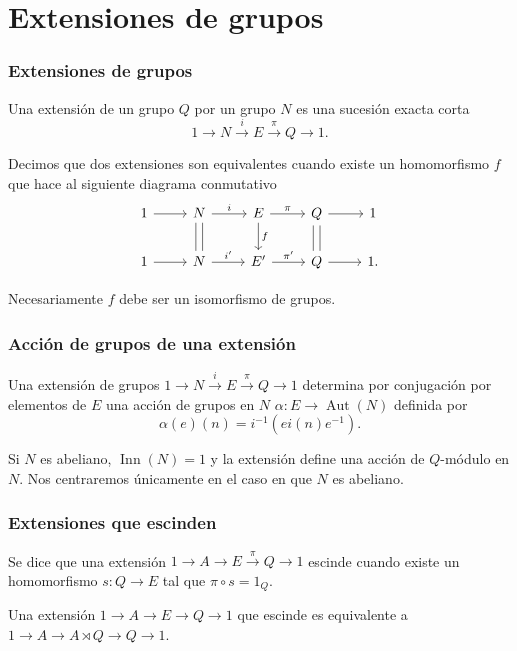 \documentclass[
	11pt, %
]{beamer}
\DeclareMathOperator{\Aut}{Aut}
\DeclareMathOperator{\Inn}{Inn}
\newcommand{\homo}[3]{#1\colon #2\to #3}
\newcommand{\extension}[5]{1\xrightarrow{} #3 \xrightarrow{#1} #4\xrightarrow{#2} #5 \xrightarrow{} 1}
\begin{document}
\section{Extensiones de grupos}

\begin{frame}[fragile]
	\frametitle{Extensiones de grupos}
	
	Una extensión de un grupo $Q$ por un grupo $N$ es una sucesión exacta corta $$\extension i \pi N E Q.$$
	
	\pause
	Decimos que dos extensiones son equivalentes cuando existe un homomorfismo $f$ que hace al siguiente diagrama conmutativo
	\[\begin{tikzcd}
		1 & N & E & Q & 1 \\
		1 & N & {E'} & Q & 1.
		\arrow[from=1-1, to=1-2]
		\arrow["i", from=1-2, to=1-3]
		\arrow["\pi", from=1-3, to=1-4]
		\arrow[from=1-4, to=1-5]
		\arrow[from=2-1, to=2-2]
		\arrow["{i'}", from=2-2, to=2-3]
		\arrow["{\pi'}", from=2-3, to=2-4]
		\arrow[from=2-4, to=2-5]
		\arrow[shift left=1, no head, from=1-4, to=2-4]
		\arrow[shift left=1, no head, from=2-4, to=1-4]
		\arrow["f", from=1-3, to=2-3]
		\arrow[shift left=1, no head, from=1-2, to=2-2]
		\arrow[shift left=1, no head, from=2-2, to=1-2]
	\end{tikzcd}\]
	
	Necesariamente $f$ debe ser un isomorfismo de grupos.
	
\end{frame}


\begin{frame}
	\frametitle{Acción de grupos de una extensión}
	Una extensión de grupos $\extension {i}{\pi} N E Q$ determina por conjugación por elementos de $E$ una acción de grupos en $N$ $\homo \alpha E {\Aut(N)}$ definida por
	$$
		\alpha(e)(n) = i^{-1}(ei(n)e^{-1}).
	$$
	
	\pause
	
	Si $N$ es abeliano, $\Inn(N) = {1}$ y la extensión define una acción de $Q$-módulo en $N$. Nos centraremos únicamente en el caso en que $N$ es abeliano.
\end{frame}

\begin{frame}
	\frametitle{Extensiones que escinden}
	
	\begin{definition}
		Se dice que una extensión $\extension {} {\pi} A E Q$ escinde cuando existe un homomorfismo $\homo s Q E$ tal que $\pi \circ s = 1_Q$. %
	\end{definition}
	
	\begin{theorem}
		Una extensión $\extension {}{} A E Q$ que escinde es equivalente a $\extension {}{} A {A\rtimes Q} Q$.
	\end{theorem}	
\end{frame}
\end{document}
